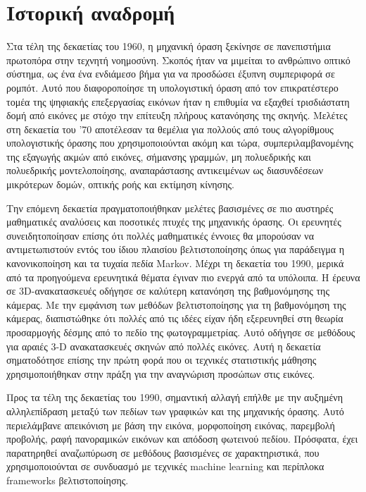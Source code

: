 \section{Ιστορική αναδρομή}

Στα τέλη της δεκαετίας του 1960, η μηχανική όραση ξεκίνησε σε πανεπιστήμια πρωτοπόρα στην τεχνητή νοημοσύνη. Σκοπός ήταν να μιμείται το ανθρώπινο οπτικό σύστημα, ως ένα ένα ενδιάμεσο βήμα για να προσδώσει έξυπνη συμπεριφορά σε ρομπότ. Αυτό που διαφοροποίησε τη υπολογιστική όραση από τον επικρατέστερο τομέα της ψηφιακής επεξεργασίας εικόνων ήταν η επιθυμία να εξαχθεί τρισδιάστατη δομή από εικόνες με στόχο την επίτευξη πλήρους κατανόησης της σκηνής. Μελέτες στη δεκαετία του '70 αποτέλεσαν τα θεμέλια για πολλούς από τους αλγορίθμους υπολογιστικής όρασης που χρησιμοποιούνται ακόμη και τώρα, συμπεριλαμβανομένης της εξαγωγής ακμών από εικόνες, σήμανσης γραμμών, μη πολυεδρικής και πολυεδρικής μοντελοποίησης, αναπαράστασης αντικειμένων ως διασυνδέσεων μικρότερων δομών, οπτικής ροής και εκτίμηση κίνησης.

Την επόμενη δεκαετία πραγματοποιήθηκαν μελέτες βασισμένες σε πιο αυστηρές μαθηματικές αναλύσεις και ποσοτικές πτυχές της μηχανικής όρασης. Οι ερευνητές συνειδητοποίησαν επίσης ότι πολλές μαθηματικές έννοιες θα μπορούσαν να αντιμετωπιστούν εντός του ίδιου πλαισίου βελτιστοποίησης όπως για παράδειγμα η κανονικοποίηση και τα τυχαία πεδία Markov. Μέχρι τη δεκαετία του 1990, μερικά από τα προηγούμενα ερευνητικά θέματα έγιναν πιο ενεργά από τα υπόλοιπα. Η έρευνα σε 3D-ανακατασκευές οδήγησε σε καλύτερη κατανόηση της βαθμονόμησης της κάμερας. Με την εμφάνιση των μεθόδων βελτιστοποίησης για τη βαθμονόμηση της κάμερας, διαπιστώθηκε ότι πολλές από τις ιδέες είχαν ήδη εξερευνηθεί στη θεωρία προσαρμογής δέσμης από το πεδίο της φωτογραμμετρίας. Αυτό οδήγησε σε μεθόδους για αραιές 3-D ανακατασκευές σκηνών από πολλές εικόνες.
Αυτή η δεκαετία σηματοδότησε επίσης την πρώτη φορά που οι τεχνικές στατιστικής μάθησης χρησιμοποιήθηκαν στην πράξη για την αναγνώριση προσώπων στις εικόνες.

Προς τα τέλη της δεκαετίας του 1990, σημαντική αλλαγή επήλθε με την αυξημένη αλληλεπίδραση μεταξύ των πεδίων των γραφικών και της μηχανικής όρασης. Αυτό περιελάμβανε απεικόνιση με βάση την εικόνα, μορφοποίηση εικόνας, παρεμβολή προβολής, ραφή πανοραμικών εικόνων και απόδοση φωτεινού πεδίου. Πρόσφατα, έχει παρατηρηθεί αναζωπύρωση σε μεθόδους βασισμένες σε χαρακτηριστικά, που χρησιμοποιούνται σε συνδυασμό με τεχνικές machine learning και περίπλοκα frameworks βελτιστοποίησης.

